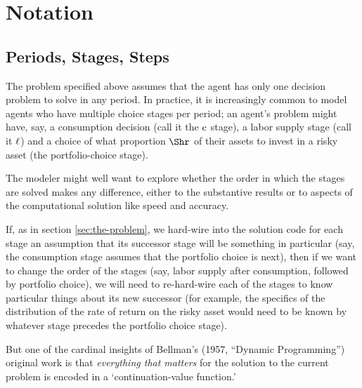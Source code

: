 
\hypertarget{notation}{}
\section{Notation}\label{sec:notation}

\subsection{Periods, Stages, Steps}

The problem specified above assumes that the agent has only one decision problem to solve in any {period}.  In practice, it is increasingly common to model agents who have multiple choice {stage}s per {period}; an agent's problem might have, say, a consumption decision (call it the $\mathrm{c}$ {stage}), a labor supply {stage} (call it $\ell$) and a choice of what proportion $\Shr$ of their assets to invest in a risky asset (the portfolio-choice {stage}).

The modeler might well want to explore whether the order in which the {stage}s are solved makes any difference, either to the substantive results or to aspects of the computational solution like speed and accuracy.

If, as in section \ref{sec:the-problem}, we hard-wire into the solution code for each {stage} an assumption that its successor {stage} will be something in particular (say, the consumption {stage} assumes that the portfolio choice is next), then if we want to change the order of the {stage}s (say, labor supply after consumption, followed by portfolio choice), we will need to re-hard-wire each of the stages to know particular things about its new successor (for example, the specifics of the distribution of the rate of return on the risky asset would need to be known by whatever {stage} precedes the portfolio choice {stage}).

But one of the cardinal insights of Bellman's (1957, ``Dynamic Programming'') original work is that \emph{everything that matters} for the solution to the current problem is encoded in a `continuation-value function.' %

